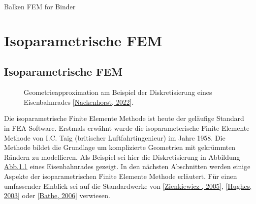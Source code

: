 \documentclass[letterpaper,10pt,german]{jupyterBook}
\let\sphinxpxdimen\pdfpxdimen\else\newdimen\sphinxpxdimen
\begin{document}
\sphinxAtStartPar
Balken FEM for Binder 

\sphinxstepscope


\part{Isoparametrische FEM}

\sphinxstepscope


\chapter{Isoparametrische FEM}
\label{\detokenize{chapters/chapter3/isoparametrischeFEM:isoparametrische-fem}}\label{\detokenize{chapters/chapter3/isoparametrischeFEM::doc}}
\begin{figure}[htbp]
\centering
\capstart

\noindent\sphinxincludegraphics[width=600\sphinxpxdimen]{{Nackenhorst_01}.png}
\caption{Geometrieapproximation am Beispiel der Diskretisierung eines Eisenbahnrades {[}\hyperlink{cite.quellen:id17}{Nackenhorst, 2022}{]}.}\label{\detokenize{chapters/chapter3/isoparametrischeFEM:isogeom}}\end{figure}

\sphinxAtStartPar
Die isoparametrische Finite Elemente Methode ist heute der geläufige Standard in FEA Software. Erstmals erwähnt wurde die isoparameterische Finite Elemente Methode von I.C. Taig (britischer Luftfahrtingenieur) im Jahre 1958. Die Methode bildet die Grundlage um komplizierte Geometrien mit gekrümmten Rändern zu modellieren. Als Beispiel sei hier die Diskretisierung in Abbildung \hyperref[\detokenize{chapters/chapter3/isoparametrischeFEM:isogeom}]{Abb.\@ \ref{\detokenize{chapters/chapter3/isoparametrischeFEM:isogeom}}} eines Eisenbahnrades gezeigt. In den nächsten Abschnitten werden einige Aspekte der isoparametrischen Finite Elemente Methode erläutert. Für einen umfassender Einblick sei auf die Standardwerke von {[}\hyperlink{cite.quellen:id3}{Zienkiewicz , 2005}{]}, {[}\hyperlink{cite.quellen:id18}{Hughes, 2003}{]} oder  {[}\hyperlink{cite.quellen:id19}{Bathe, 2006}{]} verwiesen.
\end{document}
